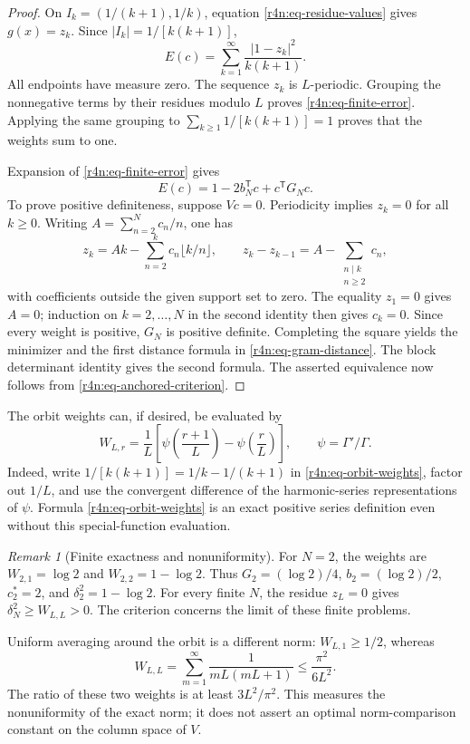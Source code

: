 \documentclass[11pt,a4paper]{article}
\theoremstyle{definition}\newtheorem{definition}[theorem]{Definition}
\theoremstyle{remark}\newtheorem{remark}[theorem]{Remark}
\numberwithin{equation}{section}
\begin{document}
\begin{proof}
On $I_k=(1/(k+1),1/k)$, equation
\eqref{r4n:eq-residue-values} gives $g(x)=z_k$.
Since $|I_k|=1/[k(k+1)]$,
\begin{equation}
\label{r4n:eq-step-norm}
 E(c)=\sum_{k=1}^{\infty}\frac{|1-z_k|^2}{k(k+1)}.
\end{equation}
All endpoints have measure zero.  The sequence $z_k$ is $L$-periodic.
Grouping the nonnegative terms by their residues modulo $L$ proves
\eqref{r4n:eq-finite-error}.  Applying the same grouping to
$\sum_{k\ge1}1/[k(k+1)]=1$ proves that the weights sum to one.

Expansion of \eqref{r4n:eq-finite-error} gives
\[
 E(c)=1-2b_N^{\mathsf T}c+c^{\mathsf T}G_Nc.
\]
To prove positive definiteness, suppose $Vc=0$.
Periodicity implies $z_k=0$ for all $k\ge0$.
Writing $A=\sum_{n=2}^Nc_n/n$, one has
\begin{equation}
\label{r4n:eq-first-difference}
 z_k=Ak-\sum_{n=2}^k c_n\lfloor k/n\rfloor,\qquad
 z_k-z_{k-1}=A-\sum_{\substack{n\mid k\\n\ge2}}c_n,
\end{equation}
with coefficients outside the given support set to zero.
The equality $z_1=0$ gives $A=0$; induction on $k=2,\ldots,N$
in the second identity then gives $c_k=0$.
Since every weight is positive, $G_N$ is positive definite.
Completing the square yields the minimizer and the first distance
formula in \eqref{r4n:eq-gram-distance}.
The block determinant identity gives the second formula.
The asserted equivalence now follows from
\eqref{r4n:eq-anchored-criterion}.
\end{proof}

The orbit weights can, if desired, be evaluated by
\begin{equation}
\label{r4n:eq-digamma}
 W_{L,r}=\frac1L\left[
       \psi\left(\frac{r+1}{L}\right)
       -\psi\left(\frac rL\right)\right],
 \qquad \psi=\Gamma'/\Gamma.
\end{equation}
Indeed, write $1/[k(k+1)]=1/k-1/(k+1)$ in
\eqref{r4n:eq-orbit-weights}, factor out $1/L$, and use the
convergent difference of the harmonic-series representations of
$\psi$.  Formula \eqref{r4n:eq-orbit-weights} is an exact positive
series definition even without this special-function evaluation.

\begin{remark}[Finite exactness and nonuniformity]
\label{r4n:rem-finite}
For $N=2$, the weights are
$W_{2,1}=\log2$ and $W_{2,2}=1-\log2$.
Thus $G_2=(\log2)/4$, $b_2=(\log2)/2$,
$c_2^*=2$, and $\delta_2^2=1-\log2$.
For every finite $N$, the residue $z_L=0$ gives
$\delta_N^2\ge W_{L,L}>0$.
The criterion concerns the limit of these finite problems.

Uniform averaging around the orbit is a different norm:
$W_{L,1}\ge1/2$, whereas
\[
 W_{L,L}=\sum_{m=1}^{\infty}\frac1{mL(mL+1)}
 \le\frac{\pi^2}{6L^2}.
\]
The ratio of these two weights is at least $3L^2/\pi^2$.
This measures the nonuniformity of the exact norm; it does not
assert an optimal norm-comparison constant on the column space of $V$.
\end{remark}
\end{document}

